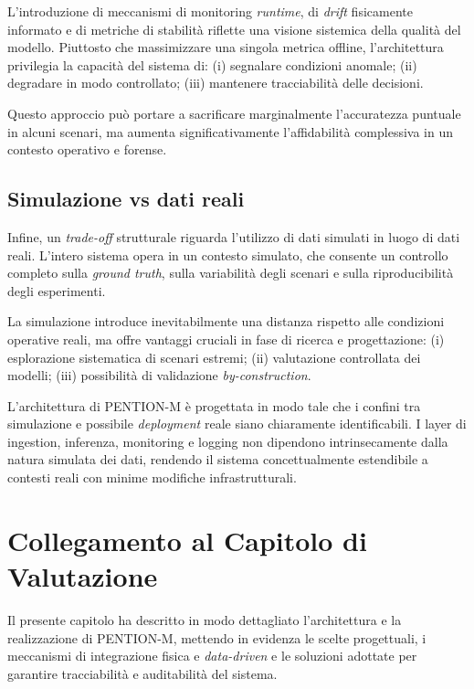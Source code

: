 L’introduzione di meccanismi di monitoring \textit{runtime}, di \textit{drift} fisicamente informato e di metriche di stabilità riflette una visione sistemica della qualità del modello.
Piuttosto che massimizzare una singola metrica offline, l’architettura privilegia la capacità del sistema di:
(i) segnalare condizioni anomale;
(ii) degradare in modo controllato;
(iii) mantenere tracciabilità delle decisioni.

Questo approccio può portare a sacrificare marginalmente l’accuratezza puntuale in alcuni scenari, ma aumenta significativamente l’affidabilità complessiva in un contesto operativo e forense.

\subsection{Simulazione vs dati reali}

Infine, un \textit{trade-off} strutturale riguarda l’utilizzo di dati simulati in luogo di dati reali.
L’intero sistema opera in un contesto simulato, che consente un controllo completo sulla \emph{ground truth}, sulla variabilità degli scenari e sulla riproducibilità degli esperimenti.

La simulazione introduce inevitabilmente una distanza rispetto alle condizioni operative reali, ma offre vantaggi cruciali in fase di ricerca e progettazione:
(i) esplorazione sistematica di scenari estremi;
(ii) valutazione controllata dei modelli;
(iii) possibilità di validazione \textit{by-construction}.

L’architettura di \textsc{PENTION-M} è progettata in modo tale che i confini tra simulazione e possibile \textit{deployment} reale siano chiaramente identificabili.
I layer di ingestion, inferenza, monitoring e logging non dipendono intrinsecamente dalla natura simulata dei dati, rendendo il sistema concettualmente estendibile a contesti reali con minime modifiche infrastrutturali.

\section{Collegamento al Capitolo di Valutazione}
\label{sec:arch_to_evaluation}

Il presente capitolo ha descritto in modo dettagliato l’architettura e la realizzazione di \textsc{PENTION-M}, mettendo in evidenza le scelte progettuali, i meccanismi di integrazione fisica e \textit{data-driven} e le soluzioni adottate per garantire tracciabilità e auditabilità del sistema.

